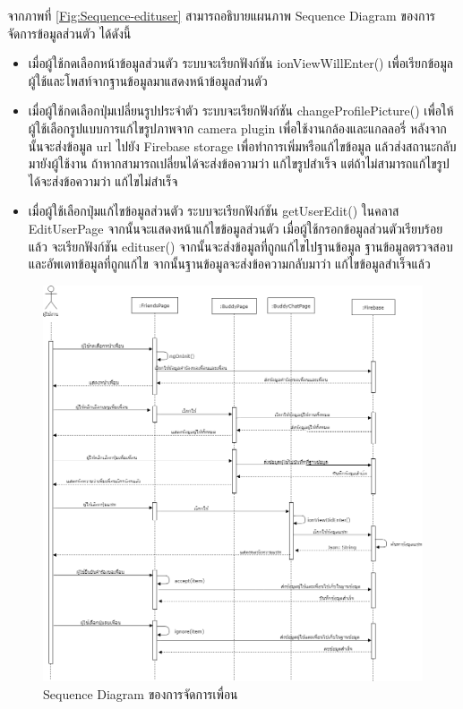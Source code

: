 จากภาพที่ \ref{Fig:Sequence-edituser} สามารถอธิบายแผนภาพ Sequence Diagram ของการจัดการข้อมูลส่วนตัว ได้ดังนี้ 
\begin{itemize}
	\item เมื่อผู้ใช้กดเลือกหน้าข้อมูลส่วนตัว ระบบจะเรียกฟังก์ชัน ionViewWillEnter() เพื่อเรียกข้อมูลผู้ใช้และโพสท์จากฐานข้อมูลมาแสดงหน้าข้อมูลส่วนตัว
	\item เมื่อผู้ใช้กดเลือกปุ่มเปลี่ยนรูปประจำตัว ระบบจะเรียกฟังก์ชัน changeProfilePicture() เพื่อให้ผู้ใช้เลือกรูปแบบการแก้ไขรูปภาพจาก camera plugin เพื่อใช้งานกล้องและแกลลอรี่ 
	หลังจากนั้นจะส่งข้อมูล url ไปยัง Firebase storage เพื่อทำการเพิ่มหรือแก้ไขข้อมูล แล้วส่งสถานะกลับมายังผู้ใช้งาน ถ้าหากสามารถเปลี่ยนได้จะส่งข้อความว่า แก้ไขรูปสำเร็จ 
	แต่ถ้าไม่สามารถแก้ไขรูปได้จะส่งข้อความว่า แก้ไขไม่สำเร็จ 
	\item เมื่อผู้ใช้เลือกปุ่มแก้ไขข้อมูลส่วนตัว ระบบจะเรียกฟังก์ชัน getUserEdit() ในคลาส EditUserPage จากนั้นจะแสดงหน้าแก้ไขข้อมูลส่วนตัว เมื่อผู้ใช้กรอกข้อมูลส่วนตัวเรียบร้อยแล้ว จะเรียกฟังก์ชัน edituser() 
	จากนั้นจะส่งข้อมูลที่ถูกแก้ไขไปฐานข้อมูล ฐานข้อมูลตรวจสอบและอัพเดทข้อมูลที่ถูกแก้ไข จากนั้นฐานข้อมูลจะส่งข้อความกลับมาว่า แก้ไขข้อมูลสำเร็จแล้ว
	\end{itemize}


\begin{figure}[H]
	\centering
	\includegraphics[width=1.1\columnwidth]
	{Figures/3/Sequence/friend}
	\caption{Sequence Diagram ของการจัดการเพื่อน}
	\label{Fig:Sequence-friend}
\end{figure}
\newpage

